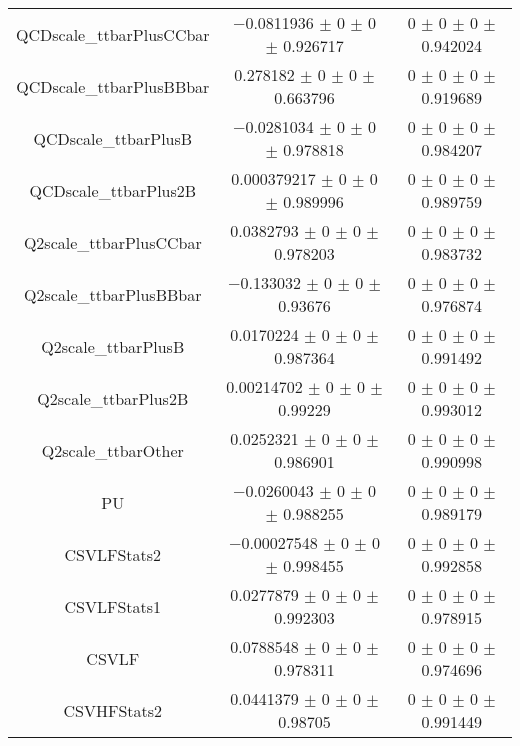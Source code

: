 \begin{table}
\begin{tabular}{ccc}
QCDscale\_ttbarPlusCCbar & \num{-0.0811936} $\pm$ \num{0} $\pm$ \num{0} $\pm$ \num{0.926717} & \num{0} $\pm$ \num{0} $\pm$ \num{0} $\pm$ \num{0.942024}\\
QCDscale\_ttbarPlusBBbar & \num{0.278182} $\pm$ \num{0} $\pm$ \num{0} $\pm$ \num{0.663796} & \num{0} $\pm$ \num{0} $\pm$ \num{0} $\pm$ \num{0.919689}\\
QCDscale\_ttbarPlusB & \num{-0.0281034} $\pm$ \num{0} $\pm$ \num{0} $\pm$ \num{0.978818} & \num{0} $\pm$ \num{0} $\pm$ \num{0} $\pm$ \num{0.984207}\\
QCDscale\_ttbarPlus2B & \num{0.000379217} $\pm$ \num{0} $\pm$ \num{0} $\pm$ \num{0.989996} & \num{0} $\pm$ \num{0} $\pm$ \num{0} $\pm$ \num{0.989759}\\
Q2scale\_ttbarPlusCCbar & \num{0.0382793} $\pm$ \num{0} $\pm$ \num{0} $\pm$ \num{0.978203} & \num{0} $\pm$ \num{0} $\pm$ \num{0} $\pm$ \num{0.983732}\\
Q2scale\_ttbarPlusBBbar & \num{-0.133032} $\pm$ \num{0} $\pm$ \num{0} $\pm$ \num{0.93676} & \num{0} $\pm$ \num{0} $\pm$ \num{0} $\pm$ \num{0.976874}\\
Q2scale\_ttbarPlusB & \num{0.0170224} $\pm$ \num{0} $\pm$ \num{0} $\pm$ \num{0.987364} & \num{0} $\pm$ \num{0} $\pm$ \num{0} $\pm$ \num{0.991492}\\
Q2scale\_ttbarPlus2B & \num{0.00214702} $\pm$ \num{0} $\pm$ \num{0} $\pm$ \num{0.99229} & \num{0} $\pm$ \num{0} $\pm$ \num{0} $\pm$ \num{0.993012}\\
Q2scale\_ttbarOther & \num{0.0252321} $\pm$ \num{0} $\pm$ \num{0} $\pm$ \num{0.986901} & \num{0} $\pm$ \num{0} $\pm$ \num{0} $\pm$ \num{0.990998}\\
PU & \num{-0.0260043} $\pm$ \num{0} $\pm$ \num{0} $\pm$ \num{0.988255} & \num{0} $\pm$ \num{0} $\pm$ \num{0} $\pm$ \num{0.989179}\\
CSVLFStats2 & \num{-0.00027548} $\pm$ \num{0} $\pm$ \num{0} $\pm$ \num{0.998455} & \num{0} $\pm$ \num{0} $\pm$ \num{0} $\pm$ \num{0.992858}\\
CSVLFStats1 & \num{0.0277879} $\pm$ \num{0} $\pm$ \num{0} $\pm$ \num{0.992303} & \num{0} $\pm$ \num{0} $\pm$ \num{0} $\pm$ \num{0.978915}\\
CSVLF & \num{0.0788548} $\pm$ \num{0} $\pm$ \num{0} $\pm$ \num{0.978311} & \num{0} $\pm$ \num{0} $\pm$ \num{0} $\pm$ \num{0.974696}\\
CSVHFStats2 & \num{0.0441379} $\pm$ \num{0} $\pm$ \num{0} $\pm$ \num{0.98705} & \num{0} $\pm$ \num{0} $\pm$ \num{0} $\pm$ \num{0.991449}\\

\end{tabular}
\end{table}
